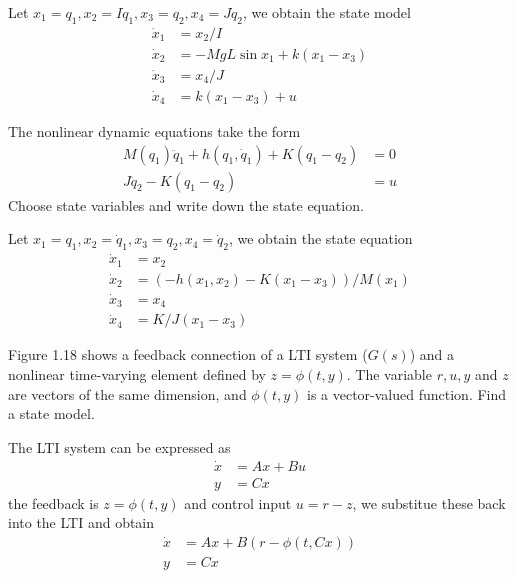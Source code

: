 \begin{solution}
Let $x_1=q_1, x_2=I\dot{q}_1, x_3=q_2, x_4=J\dot{q}_2$, we obtain the state model
\begin{align*}
\dot{x}_1 &= x_2/I \\
\dot{x}_2 &= -MgL\sin x_1 + k(x_1-x_3) \\
\dot{x}_3 &= x_4/J \\
\dot{x}_4 &= k(x_1-x_3) + u
\end{align*}
\end{solution}

\begin{exer}
The nonlinear dynamic equations take the form
\begin{align*}
M(q_1)\ddot{q}_1+h(q_1,\dot{q}_1) + K(q_1-q_2) &= 0 \\
J\ddot{q}_2 - K(q_1-q_2) &= u
\end{align*}
Choose state variables and write down the state equation.
\end{exer}

\begin{solution}
Let $x_1=q_1,x_2=\dot{q}_1,x_3=q_2,x_4=\dot{q}_2$, we obtain the state equation 
\begin{align*}
\dot{x}_1 &= x_2 \\
\dot{x}_2 &= (-h(x_1,x_2)-K(x_1-x_3))/M(x_1) \\
\dot{x}_3 &= x_4 \\
\dot{x}_4 &= K/J(x_1-x_3)
\end{align*}
\end{solution}

\begin{exer}
Figure 1.18 shows a feedback connection of a LTI system ($G(s)$) and a nonlinear
time-varying element defined by $z=\phi(t,y)$. The variable $r,u,y$ and $z$ are
vectors of the same dimension, and $\phi(t,y)$ is a vector-valued function. Find a 
state model.
\end{exer}

\begin{solution}
The LTI system can be expressed as
\begin{align*}
\dot{x} &= Ax + Bu \\
y &= Cx
\end{align*}
the feedback is $z=\phi(t,y)$ and control input $u=r-z$, we substitue these back 
into the LTI and obtain
\begin{align*}
\dot{x} &= Ax + B(r-\phi(t,Cx)) \\
y &= Cx
\end{align*}
\end{solution}

